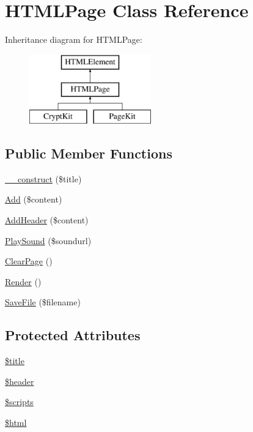 \hypertarget{class_h_t_m_l_page}{\section{H\-T\-M\-L\-Page Class Reference}
\label{class_h_t_m_l_page}
}
Inheritance diagram for H\-T\-M\-L\-Page\-:\begin{figure}[H]
\begin{center}
\leavevmode
\includegraphics[height=3.000000cm]{class_h_t_m_l_page}
\end{center}
\end{figure}
\subsection*{Public Member Functions}
\begin{DoxyCompactItemize}
\item 
\hyperlink{class_h_t_m_l_page_a6220f56b893af1eeeaa7bb84f6ca13b2}{\-\_\-\-\_\-construct} (\$title)
\item 
\hyperlink{class_h_t_m_l_page_a6a54104bbbaeee3dffbc269b526c70d4}{Add} (\$content)
\item 
\hyperlink{class_h_t_m_l_page_a728d47dc8dffe39b76d0feb6491b437c}{Add\-Header} (\$content)
\item 
\hyperlink{class_h_t_m_l_page_aec006b57e0f96d8b799f0f7ea22871f1}{Play\-Sound} (\$soundurl)
\item 
\hyperlink{class_h_t_m_l_page_a83649c48e61c09d8e80d72163b50d638}{Clear\-Page} ()
\item 
\hyperlink{class_h_t_m_l_page_a1a6915de89093bc6383d7c1f18ab81e2}{Render} ()
\item 
\hyperlink{class_h_t_m_l_page_a205a4450570ca0868c4334c334859be9}{Save\-File} (\$filename)
\end{DoxyCompactItemize}
\subsection*{Protected Attributes}
\begin{DoxyCompactItemize}
\item 
\hyperlink{class_h_t_m_l_page_ada57e7bb7c152edad18fe2f166188691}{\$title}
\item 
\hyperlink{class_h_t_m_l_page_a4f44601f2b9dc8a1644bce53c94ce622}{\$header}
\item 
\hyperlink{class_h_t_m_l_page_a271c9f1463d598b29e28b6642d175365}{\$scripts}
\item 
\hyperlink{class_h_t_m_l_page_a6f96e7fc92441776c9d1cd3386663b40}{\$html}
\end{DoxyCompactItemize}


